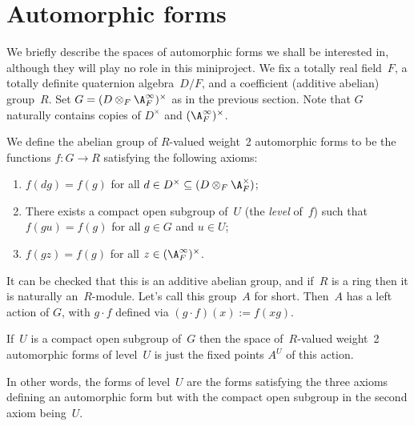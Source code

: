 \section{Automorphic forms}

We briefly describe the spaces of automorphic forms we shall be interested in, although
they will play no role in this miniproject. We fix a totally real field~$F$, a
totally definite quaternion algebra~$D/F$, and a coefficient (additive abelian) group~$R$.
Set $G=(D\otimes_F\A_F^\infty)^\times$ as in the previous section. Note that $G$
naturally contains copies of $D^\times$ and $(\A_F^\infty)^\times$.

\begin{definition}
  \label{TotallyDefiniteQuaternionAlgebra.WeightTwoAutomorphicForm}
  \leanok
  We define the abelian group of $R$-valued weight~2 automorphic forms
to be the functions $f:G\to R$ satisfying the following axioms:
\begin{enumerate}
  \item $f(dg)=f(g)$ for all $d\in D^\times\subseteq(D\otimes_F\A_F^\times)$;
  \item There exists a compact open subgroup of~$U$ (the \emph{level} of~$f$)
    such that $f(gu)=f(g)$ for all $g\in G$ and $u\in U$;
  \item $f(gz)=f(g)$ for all $z\in(\A_F^\infty)^\times$.
\end{enumerate}
\end{definition}

It can be checked that this is an additive abelian group, and if~$R$ is a ring
then it is naturally an~$R$-module. Let's call this group~$A$ for short.
Then~$A$ has a left action of $G$, with $g\cdot f$
defined via $(g\cdot f)(x):=f(xg)$.

\begin{definition}
  \label{TotallyDefiniteQuaternionAlgebra.WeightTwoAutomorphicFormOfLevel}
  \leanok
  If~$U$ is a compact open subgroup of~$G$ then the space of~$R$-valued weight~2
  automorphic forms of level~$U$ is just the fixed points $A^U$ of this action.
\end{definition}

In other words, the forms of level~$U$ are the forms satisfying the three axioms
defining an automorphic form but with the compact open subgroup in the second
axiom being~$U$.

